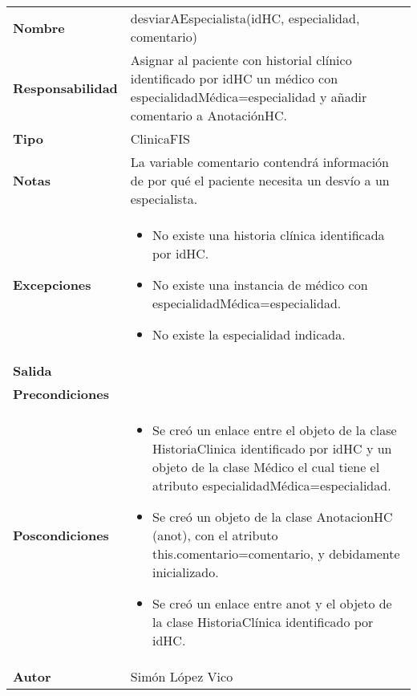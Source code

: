 \documentclass[11pt,a4paper]{article}
\begin{document}
\begin{table}[H]
	\centering
	\label{my-label}
	\begin{tabularx}{\textwidth}{l|X}
		\textbf{Nombre}          & desviarAEspecialista(idHC, especialidad, comentario)\\
		\textbf{Responsabilidad} & Asignar al paciente con historial clínico identificado por idHC un médico con especialidadMédica=especialidad y añadir comentario a AnotaciónHC.\\
		\textbf{Tipo}            & ClinicaFIS \\
		\textbf{Notas}           & La variable comentario contendrá información de por qué el paciente necesita un desvío a un especialista. \\
		\textbf{Excepciones}     &
		\begin{itemize}
			\item No existe una historia clínica identificada por idHC.
			\item No existe una instancia de médico con especialidadMédica=especialidad.
			\item No existe la especialidad indicada.
		\end{itemize} \\
		\textbf{Salida}          &  \\
		\textbf{Precondiciones}  &  \\
		\textbf{Poscondiciones}  &
		\begin{itemize}
			\item Se creó un enlace entre el objeto de la clase HistoriaClinica identificado por idHC y un objeto de la clase Médico el cual tiene el atributo especialidadMédica=especialidad.
			\item Se creó un objeto de la clase AnotacionHC (anot), con el atributo this.comentario=comentario, y debidamente inicializado.
			\item Se creó un enlace entre anot y el objeto de la clase HistoriaClínica identificado por idHC.
		\end{itemize} \\
		\textbf{Autor}			 & Simón López Vico
	\end{tabularx}
\end{table}
\end{document}

